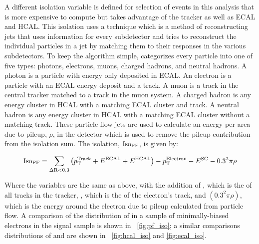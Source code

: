 A different isolation variable is defined for selection of events in this
analysis that is more expensive to compute but takes advantage of the tracker
as well as ECAL and HCAL. This isolation uses a
\particleflow\cite{particle_flow_2010} technique which is a method of
reconstructing jets that uses information for every subdetector and tries to
reconstruct the individual particles in a jet by matching them to their
responses in the various subdetectors. To keep the algorithm simple,
\particleflow categorizes every particle into one of five types: photons,
electrons, muons, charged hadrons, and neutral hadrons. A photon is a particle
with energy only deposited in ECAL. An electron is a particle with an ECAL
energy deposit and a track. A muon is a track in the central tracker matched to
a track in the muon system. A charged hadron is any energy cluster in HCAL with
a matching ECAL cluster and track. A neutral hadron is any energy cluster in
HCAL with a matching ECAL cluster without a matching track. These particle flow
jets are used to calculate an energy per area due to pileup, $\rho$, in the
detector which is used to remove the pileup contribution from the isolation
sum. The \particleflow isolation, $\text{Iso}_{\text{PF}}$, is given by:

\begin{equation}
    \text{Iso}_{\text{PF}} = \sum_{\Delta \text{R}<0.3} \left(p_{\mathrm{T}}^{\text{Track}} + E^{\text{ECAL}} + E^{\text{HCAL}}\right) - p_{\mathrm{T}}^{\text{Electron}}
    - E^{\text{SC}} - 0.3^{2} \pi \rho
\end{equation}

Where the variables are the same as above, with the addition of \ptTrack, which
is the \pt of all tracks in the tracker, \ptElectron, which is the \pt of the
electron's track, and $\left(0.3^{2} \pi \rho\right)$, which is the energy
around the electron due to pileup calculated from particle flow. A comparison
of the distribution of \PFISO in a sample of minimally-biased electrons in the
\MADGRAPH signal sample is shown in \FIG~\ref{fig:pf_iso}; a similar
comparisons distributions of \HCALISO and \ECALISO are shown in
\FIGS~\ref{fig:hcal_iso} and \ref{fig:ecal_iso}.

